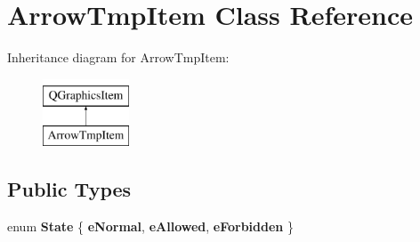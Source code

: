 \hypertarget{class_arrow_tmp_item}{\section{Arrow\-Tmp\-Item Class Reference}
\label{class_arrow_tmp_item}
}
Inheritance diagram for Arrow\-Tmp\-Item\-:\begin{figure}[H]
\begin{center}
\leavevmode
\includegraphics[height=2.000000cm]{class_arrow_tmp_item}
\end{center}
\end{figure}
\subsection*{Public Types}
\begin{DoxyCompactItemize}
\item 
enum {\bfseries State} \{ {\bfseries e\-Normal}, 
{\bfseries e\-Allowed}, 
{\bfseries e\-Forbidden}
 \}
\end{DoxyCompactItemize}
